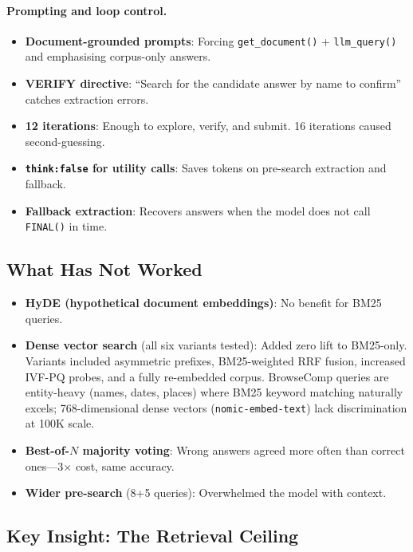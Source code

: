\documentclass[11pt,a4paper]{article}
\begin{document}
\paragraph{Prompting and loop control.}
\begin{itemize}[nosep]
  \item \textbf{Document-grounded prompts}: Forcing \texttt{get\_document()} +
        \texttt{llm\_query()} and emphasising corpus-only answers.
  \item \textbf{VERIFY directive}: ``Search for the candidate answer by name to
        confirm'' catches extraction errors.
  \item \textbf{12 iterations}: Enough to explore, verify, and submit. 16
        iterations caused second-guessing.
  \item \textbf{\texttt{think:false} for utility calls}: Saves tokens on
        pre-search extraction and fallback.
  \item \textbf{Fallback extraction}: Recovers answers when the model does not
        call \texttt{FINAL()} in time.
\end{itemize}

\subsection{What Has Not Worked}

\begin{itemize}[nosep]
  \item \textbf{HyDE (hypothetical document embeddings)}: No benefit for
        BM25 queries.
  \item \textbf{Dense vector search} (all six variants tested): Added zero
        lift to BM25-only. Variants included asymmetric prefixes, BM25-weighted
        RRF fusion, increased IVF-PQ probes, and a fully re-embedded corpus.
        BrowseComp queries are entity-heavy (names, dates, places) where BM25
        keyword matching naturally excels; 768-dimensional dense vectors
        (\texttt{nomic-embed-text}) lack discrimination at 100K scale.
  \item \textbf{Best-of-$N$ majority voting}: Wrong answers agreed more often
        than correct ones---3$\times$ cost, same accuracy.
  \item \textbf{Wider pre-search} (8+5 queries): Overwhelmed the model with
        context.
\end{itemize}

\subsection{Key Insight: The Retrieval Ceiling}
\end{document}
